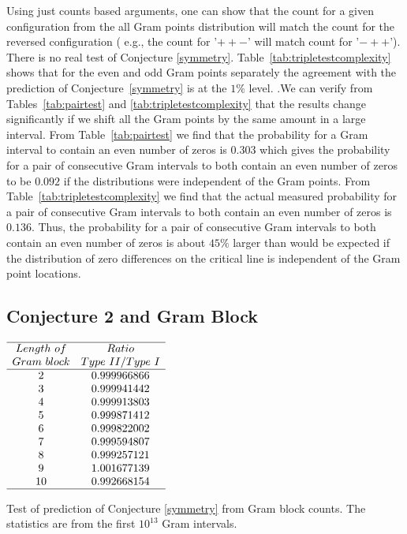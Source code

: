 \documentclass[twoside]{article}
\begin{document}
Using just counts based arguments, one can show that the count for a given configuration from the all Gram points distribution  will match the count for the reversed configuration ( e.g., the count for '$++-$' will match count for '$-++$'). There is no real test of Conjecture \ref{symmetry}.
Table~\ref{tab:tripletestcomplexity} shows that for the even and odd Gram points separately the agreement with the prediction of Conjecture~\ref{symmetry} is at the $1\%$ level. .We can verify from Tables~\ref{tab:pairtest} and \ref{tab:tripletestcomplexity} that  the results change significantly if we shift all the Gram points by the same amount in a large interval. From Table~\ref{tab:pairtest} we find that the probability for a Gram interval to contain an even number of zeros is $0.303$ which gives the  probability for a pair of consecutive  Gram intervals to both contain an even number of zeros to be $0.092$ if the distributions were independent of the Gram points.   From Table~\ref{tab:tripletestcomplexity} we find that the actual measured probability for a pair of consecutive  Gram intervals to both contain an even number of zeros is $0.136$. Thus, the  probability for a pair of consecutive  Gram intervals to both contain an even number of zeros is about $45\%$ larger than would be expected if the distribution of zero differences on the critical line is independent of the Gram point locations.

\subsection{\label{sec4c}Conjecture 2 and Gram Block}

\begin{table}
\centering \(\begin{array}{cc}
\hline
Length~of 	& Ratio  \\
Gram~block	& Type~II/Type~I \\
\hline
2& 0.999966866\\
3& 0.999941442\\
4& 0.999913803\\
5& 0.999871412\\
6& 0.999822002\\
7& 0.999594807\\
8& 0.999257121\\
9& 1.001677139\\
10& 0.992668154\\
\hline
\end{array}\)
\caption{Test of prediction of Conjecture \ref{symmetry} from Gram block counts. The statistics are from the first $10^{13}$ Gram intervals.} \label{tab:rosser}
\end{table}
\end{document}
